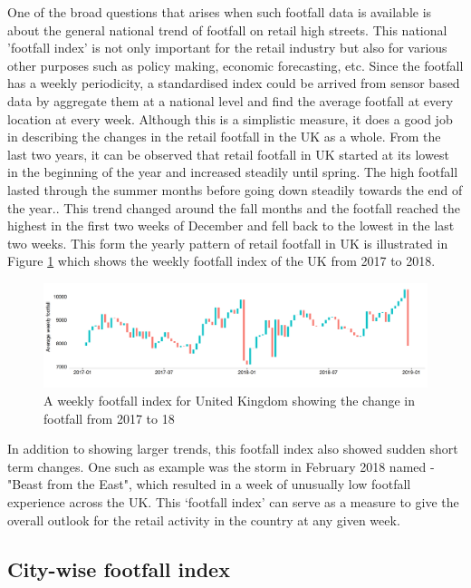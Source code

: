 One of the broad questions that arises when such footfall data is available is about the general national trend of footfall on retail high streets.
This national 'footfall index' is not only important for the retail industry but also for various other purposes such as policy making, economic forecasting, etc.
Since the footfall has a weekly periodicity, a standardised index could be arrived from sensor based data by aggregate them at a national level and find the average footfall at every location at every week. 
Although this is a simplistic measure, it does a good job in describing the changes in the retail footfall in the UK as a whole.
From the last two years, it can be observed that retail footfall in UK started at its lowest in the beginning of the year and increased steadily until spring.
The high footfall lasted through the summer months before going down steadily towards the end of the year..
This trend changed around the fall months and the footfall reached the highest in the first two weeks of December and fell back to the lowest in the last two weeks.
This form the yearly pattern of retail footfall in UK is illustrated in Figure \ref{figure:applications:footfall:index} which shows the weekly footfall index of the UK from 2017 to 2018. 

\begin{figure}
  \includegraphics[trim={0 25 0 10},clip]{images/applications-footfall-index.png}
  \caption{A weekly footfall index for United Kingdom showing the change in footfall from 2017 to 18}
  \label{figure:applications:footfall:index}
\end{figure}

In addition to showing larger trends, this footfall index also showed sudden short term changes. 
One such as example was the storm in February 2018 named - "Beast from the East", which resulted in a week of unusually low footfall experience across the UK.
This `footfall index' can serve as a measure to give the overall outlook for the 
retail activity in the country at any given week.

\subsection{City-wise footfall index}

